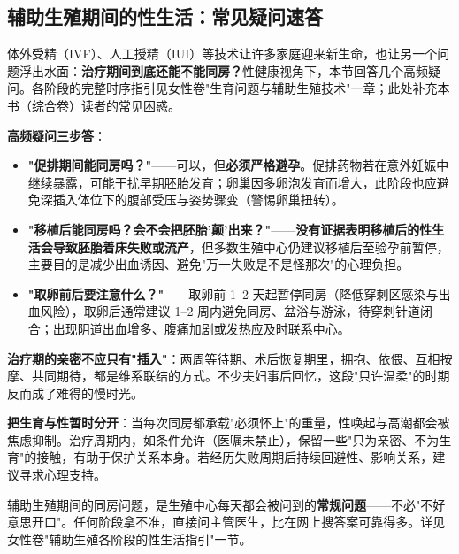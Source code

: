 \subsection{辅助生殖期间的性生活：常见疑问速答}

体外受精（IVF）、人工授精（IUI）等技术让许多家庭迎来新生命，也让另一个问题浮出水面：\textbf{治疗期间到底还能不能同房？}性健康视角下，本节回答几个高频疑问。各阶段的完整时序指引见女性卷"生育问题与辅助生殖技术"一章；此处补充本书（综合卷）读者的常见困惑。

\vspace{0.5em}
\noindent\textbf{高频疑问三步答}：

\begin{itemize}
	\item \textbf{"促排期间能同房吗？"}——可以，但\textbf{必须严格避孕}。促排药物若在意外妊娠中继续暴露，可能干扰早期胚胎发育；卵巢因多卵泡发育而增大，此阶段也应避免深插入体位下的腹部受压与姿势骤变（警惕卵巢扭转）。
	\item \textbf{"移植后能同房吗？会不会把胚胎'颠'出来？"}——\textbf{没有证据表明移植后的性生活会导致胚胎着床失败或流产}，但多数生殖中心仍建议移植后至验孕前暂停，主要目的是减少出血诱因、避免"万一失败是不是怪那次"的心理负担。
	\item \textbf{"取卵前后要注意什么？"}——取卵前 1--2 天起暂停同房（降低穿刺区感染与出血风险），取卵后通常建议 1--2 周内避免同房、盆浴与游泳，待穿刺针道闭合；出现阴道出血增多、腹痛加剧或发热应及时联系中心。
\end{itemize}

\vspace{0.5em}
\noindent\textbf{治疗期的亲密不应只有"插入"}：两周等待期、术后恢复期里，拥抱、依偎、互相按摩、共同期待，都是维系联结的方式。不少夫妇事后回忆，这段"只许温柔"的时期反而成了难得的慢时光。

\vspace{0.5em}
\noindent\textbf{把生育与性暂时分开}：当每次同房都承载"必须怀上"的重量，性唤起与高潮都会被焦虑抑制。治疗周期内，如条件允许（医嘱未禁止），保留一些"只为亲密、不为生育"的接触，有助于保护关系本身。若经历失败周期后持续回避性、影响关系，建议寻求心理支持。

\begin{tcolorbox}[colback=pink!5!white,colframe=red!50!black,title=贴心小叮咛]
辅助生殖期间的同房问题，是生殖中心每天都会被问到的\textbf{常规问题}——不必"不好意思开口"。任何阶段拿不准，直接问主管医生，比在网上搜答案可靠得多。详见女性卷"辅助生殖各阶段的性生活指引"一节。
\end{tcolorbox}
